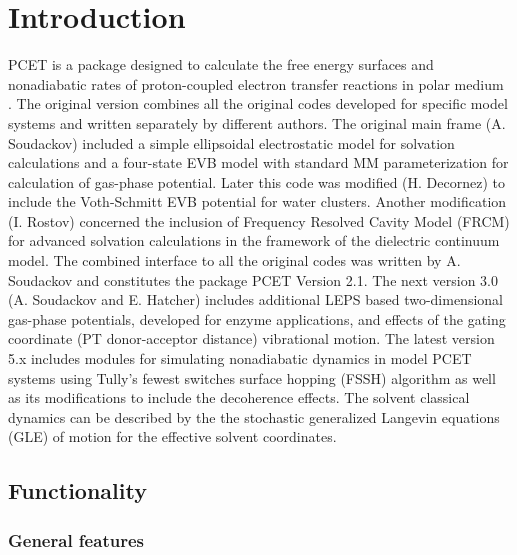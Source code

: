 \documentclass[oneside,11pt,openany]{book}
\begin{document}
\chapter{Introduction}
PCET is a package designed to calculate the free energy surfaces
and nonadiabatic rates of proton-coupled electron transfer reactions in
polar medium \cite{pcet-jcp1,pcet-jacs,pcet-jcp2,pcet-jpc}. The original
version combines all the original codes developed for specific model
systems and written separately by different authors. The original
main frame (A. Soudackov) included a simple ellipsoidal electrostatic
model for solvation calculations and a four-state EVB model with
standard MM parameterization for calculation of gas-phase potential.
Later this code was modified (H. Decornez) to include the Voth-Schmitt
EVB potential for water clusters. Another modification (I. Rostov)
concerned the inclusion of Frequency Resolved Cavity Model (FRCM) for
advanced solvation calculations in the framework of the dielectric continuum model.
The combined interface to all the original codes was written by A. Soudackov
and constitutes the package PCET Version 2.1. The next version 3.0
(A. Soudackov and E. Hatcher) includes additional LEPS based
two-dimensional gas-phase potentials, developed for enzyme applications,
and effects of the gating coordinate (PT donor-acceptor distance)
vibrational motion. The latest version 5.x includes modules for simulating
nonadiabatic dynamics in model PCET systems using Tully's fewest switches
surface hopping (FSSH) algorithm as well as its modifications to include
the decoherence effects. The solvent classical dynamics can be described
by the the stochastic generalized Langevin equations (GLE) of motion for the
effective solvent coordinates.

\section{Functionality}

\subsection{General features}
\end{document}
